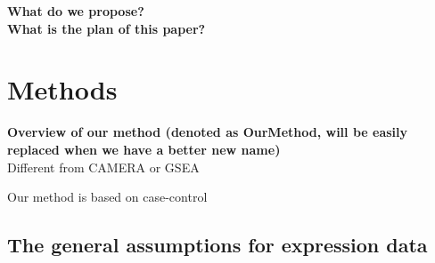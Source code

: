 \documentclass[11pt, a4paper]{article}
\begin{document}
	
	\textbf{What do we propose?} \\
	
	
	
	\textbf{What is the plan of this paper?} \\
	\section{Methods}\label{section:methods}
	\textbf{Overview of our method (denoted as OurMethod, will be easily replaced when we have a better new name)} \\
	Different from CAMERA\cite{wu2012camera} or GSEA \citep{subramanian2005gene}
	
	Our method is based on case-control
	
	\subsection{The general assumptions for expression data}\label{subsection:assumption}
\end{document}
